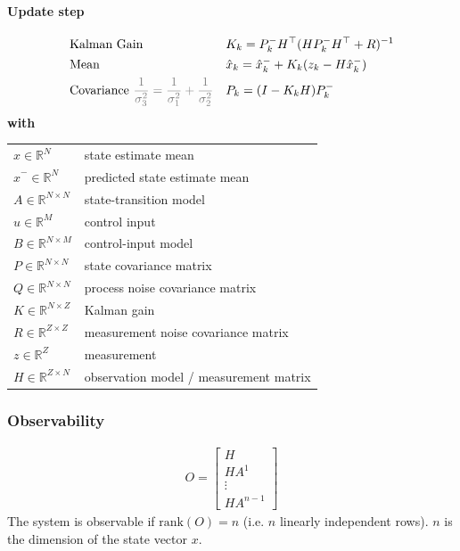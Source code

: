 \begin{multicols*}{2}
\paragraph{Update step}
\begin{align*}
	&\text{Kalman Gain} && K_k = P_k^- H^\top (H P_k^- H^\top + R)^{-1} \\
	&\text{Mean} && \hat{x}_k = \hat{x}_k^- + K_k (z_k - H \hat{x}_k^-) \\
	&\text{Covariance } \textcolor{gray}{\frac{1}{\sigma_3^2} = \frac{1}{\sigma_1^2} + \frac{1}{\sigma_2^2}} && P_k = (I - K_k H) P_k^-
\end{align*}
\textbf{with}\\
\vspace{5mm}
\begin{tabular}{ll}
	\\[-1em]
	$\hat{x} \in \mathbb{R}^N$ & state estimate mean \\
	$\hat{x}^- \in \mathbb{R}^N$ & predicted state estimate mean \\
	$A \in \mathbb{R}^{N \times N}$ & state-transition model \\
	$u  \in \mathbb{R}^M$ & control input \\
	$B \in \mathbb{R}^{N \times M}$ & control-input model \\
	$P \in \mathbb{R}^{N \times N}$ & state covariance matrix \\
	$Q  \in \mathbb{R}^{N \times N}$ & process noise covariance  matrix \\
	$K \in \mathbb{R}^{N \times Z}$ & Kalman gain \\
	$R \in \mathbb{R}^{Z \times Z}$ & measurement noise covariance matrix \\
	$z \in \mathbb{R}^Z$ & measurement \\
	$H \in \mathbb{R}^{Z \times N}$ & observation model / measurement matrix
\end{tabular}

\subsubsection{Observability}
\begin{align*}
O = \begin{bmatrix} H \\ HA^1 \\ \vdots  \\ HA^{n-1} \end{bmatrix}
\end{align*}
The system is observable if $\text{rank}(O) = n$ (i.e. $n$ linearly independent rows).
$n$ is the dimension of the state vector $x$.


\end{multicols*}
